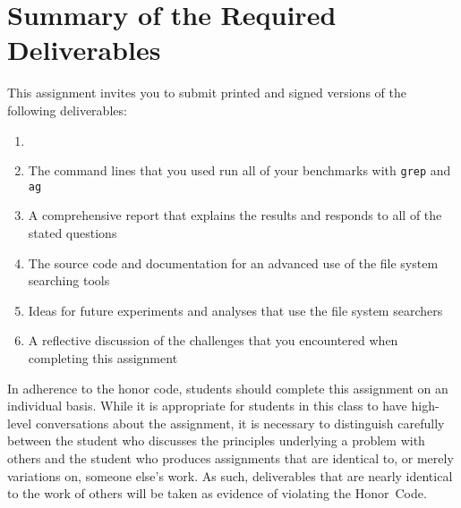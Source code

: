 \section*{Summary of the Required Deliverables}

This assignment invites you to submit printed and signed versions of the following deliverables: 

\begin{enumerate}

  \item 

  \item The command lines that you used run all of your benchmarks with {\tt grep} and {\tt ag} 

  \item A comprehensive report that explains the results and responds to all of the stated questions 

  \item The source code and documentation for an advanced use of the file system searching tools

  \item Ideas for future experiments and analyses that use the file system searchers 

  \item A reflective discussion of the challenges that you encountered when completing this assignment

\end{enumerate}

In adherence to the honor code, students should complete this assignment on an individual basis. While it is appropriate
for students in this class to have high-level conversations about the assignment, it is necessary to distinguish
carefully between the student who discusses the principles underlying a problem with others and the student who produces
assignments that are identical to, or merely variations on, someone else's work.  As such, deliverables that are nearly
identical to the work of others will be taken as evidence of violating the \mbox{Honor Code}.  

  
